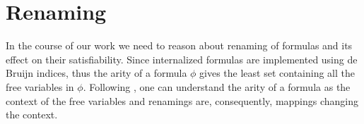 \section{Renaming}

In the course of our work we need to reason about renaming of formulas
and its effect on their satisfiability. Since internalized formulas
are implemented using de Bruijn indices, thus the arity of a formula
$\phi$ gives the least set containing all the free variables in
$\phi$. Following \citet{fiore-abssyn}, one can understand the arity
of a formula as the context of the free variables and renamings are,
consequently, mappings changing the context.


